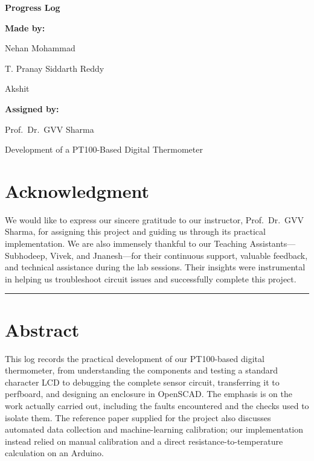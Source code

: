 \documentclass[12pt,a4paper]{article}
\begin{document}
\begin{titlepage}
    \centering
    \vspace*{1.4cm}
    {\Huge\bfseries Progress Log\par}
    \vspace{1.8cm}
    {\Large\bfseries Made by:\par}
    \vspace{0.6cm}
    {\large Nehan Mohammad\par}
    \vspace{0.25cm}
    {\large T. Pranay Siddarth Reddy\par}
    \vspace{0.25cm}
    {\large Akshit\par}
    \vspace{1.3cm}
    {\Large\bfseries Assigned by:\par}
    \vspace{0.6cm}
    {\large Prof.\ Dr.\ GVV Sharma\par}
    \vfill
    {\large Development of a PT100-Based Digital Thermometer\par}
\end{titlepage}

\tableofcontents
\clearpage

\section*{Acknowledgment}
We would like to express our sincere gratitude to our instructor,
Prof.\ Dr.\ GVV Sharma, for assigning this project and guiding us
through its practical implementation. We are also immensely thankful
to our Teaching Assistants---Subhodeep, Vivek, and Jnanesh---for their
continuous support, valuable feedback, and technical assistance during
the lab sessions. Their insights were instrumental in helping us
troubleshoot circuit issues and successfully complete this project.

\vspace{0.8cm}
\noindent\rule{\linewidth}{0.4pt}
\vspace{0.4cm}

\section*{Abstract}
This log records the practical development of our PT100-based digital
thermometer, from understanding the components and testing a standard
character LCD to debugging the complete sensor circuit, transferring it
to perfboard, and designing an enclosure in OpenSCAD. The emphasis is on
the work actually carried out, including the faults encountered and the
checks used to isolate them. The reference paper supplied for the project
also discusses automated data collection and machine-learning calibration;
our implementation instead relied on manual calibration and a direct
resistance-to-temperature calculation on an Arduino.
\end{document}
